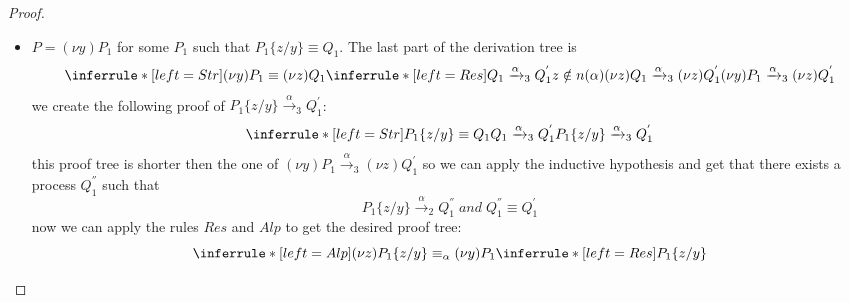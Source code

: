 \begin{theorem}
\begin{proof}
\begin{description}
\begin{itemize}
\begin{description}
\begin{itemize}
			\[
			  \inferrule* [left=Str]{
			      (\nu z)P_{1}\equiv (\nu z)Q_{1}
			    \\
			      \inferrule* [left=Res]{
				  Q_{1}\xrightarrow{\alpha}_{3}Q_{1}^{'}
				\\
				  z\notin n(\alpha)
			      }{
				(\nu z)Q_{1}\xrightarrow{\alpha}_{3}(\nu z)Q_{1}^{'}
			      }
			  }{
			    (\nu z)P_{1}\xrightarrow{\alpha}_{3}(\nu z)Q_{1}^{'}
			  }
			\]
			first we create the following proof:
			\[
			      \inferrule* [left=Str]{
				  P_{1}\equiv Q_{1}
				\\
				  Q_{1}
				    \xrightarrow{\alpha}_{3}
				      Q_{1}^{'}
			      }{
				P_{1}\xrightarrow{\alpha}_{3}Q_{1}^{'}
			      }
			\]
			now we can apply the inductive hypothesis and get $P_{1}\xrightarrow{\alpha}_{2}Q_{1}^{''}$ where $Q_{1}^{'}\equiv Q_{1}^{''}$. The last step is 
			\[
			  \inferrule* [left=Res]{
			      P_{1}\xrightarrow{\alpha}_{2}Q_{1}^{''}
			    \\
			      z\notin n(\alpha)
			  }{
			    (\nu z)P_{1}\xrightarrow{\alpha}_{2}(\nu z)Q_{1}^{''}
			  }
			\]
		      \item
			$P=(\nu y)P_{1}$ for some $P_{1}$ such that $P_{1}\{z/y\}\equiv Q_{1}$. The last part of the derivation tree is 
			\[
			  \inferrule* [left=Str]{
			      (\nu y)P_{1}\equiv (\nu z)Q_{1}
			    \\
			      \inferrule* [left=Res]{
				  Q_{1}\xrightarrow{\alpha}_{3}Q_{1}^{'}
				\\
				  z\notin n(\alpha)
			      }{
				(\nu z)Q_{1}\xrightarrow{\alpha}_{3}(\nu z)Q_{1}^{'}
			      }
			  }{
			    (\nu y)P_{1}\xrightarrow{\alpha}_{3}(\nu z)Q_{1}^{'}
			  }
			\]
			we create the following proof of $P_{1}\{z/y\}\xrightarrow{\alpha}_{3}Q_{1}^{'}$:
			\[
			  \inferrule* [left=Str]{
			      P_{1}\{z/y\}\equiv Q_{1}
			    \\
			      Q_{1}\xrightarrow{\alpha}_{3}Q_{1}^{'}
			  }{
			    P_{1}\{z/y\}\xrightarrow{\alpha}_{3}Q_{1}^{'}
			  }
			\]
			this proof tree is shorter then the one of $(\nu y)P_{1}\xrightarrow{\alpha}_{3}(\nu z)Q_{1}^{'}$ so we can apply the inductive hypothesis and get that there exists a process $Q_{1}^{''}$ such that 
			\[
			  P_{1}\{z/y\}\xrightarrow{\alpha}_{2}Q_{1}^{''}\; and\; Q_{1}^{''}\equiv Q_{1}^{'}
			\]
			now we can apply the rules $Res$ and $Alp$ to get the desired proof tree:
			\[
			  \inferrule* [left=Alp]{
				(\nu z)P_{1}\{z/y\}\equiv_{\alpha} (\nu y)P_{1}
			      \\
				\inferrule* [left=Res]{
				    P_{1}\{z/y\}
}}\]
\end{itemize}
\end{description}
\end{itemize}
\end{description}
\end{proof}
\end{theorem}
